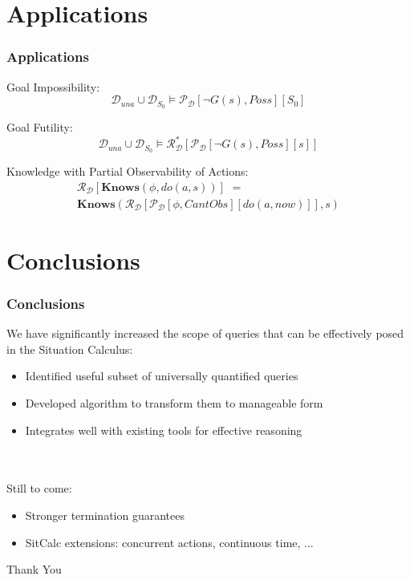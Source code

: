 \documentclass[compress]{beamer}
\begin{document}
\section{Applications}

\begin{frame}
\frametitle{Applications}
Goal Impossibility:
\begin{equation*}
\mathcal{D}_{una}\cup\mathcal{D}_{S_0} \models \mathcal{P}_{\mathcal{D}}[\neg G(s),Poss][S_0]
\end{equation*}

Goal Futility:
\begin{equation*}
\mathcal{D}_{una}\cup\mathcal{D}_{S_0} \models \mathcal{R}^*_{\mathcal{D}}[\mathcal{P}_{\mathcal{D}}[\neg G(s),Poss][s]]
\end{equation*}

Knowledge with Partial Observability of Actions:
\begin{multline*}
\mathcal{R}_{\mathcal{D}}[\mathbf{Knows}(\phi,do(a,s))]\,\,=\\
  \mathbf{Knows}(\mathcal{R}_{\mathcal{D}}[\mathcal{P}_{\mathcal{D}}[\phi,CantObs][do(a,now)]],s)
\end{multline*}
\end{frame}

\section{Conclusions}

\begin{frame}
\frametitle{Conclusions}
We have significantly increased the scope of queries that can be effectively
posed in the Situation Calculus:
\begin{itemize}
 \item Identified useful subset of universally quantified queries
 \item Developed algorithm to transform them to manageable form
 \item Integrates well with existing tools for effective reasoning
\end{itemize}
\ \\
\ \\
Still to come:
\begin{itemize}
 \item Stronger termination guarantees
 \item SitCalc extensions: concurrent actions, continuous time, ...
\end{itemize}
\end{frame}

\begin{frame}
\centering \large Thank You\\
\end{frame}
\end{document}
